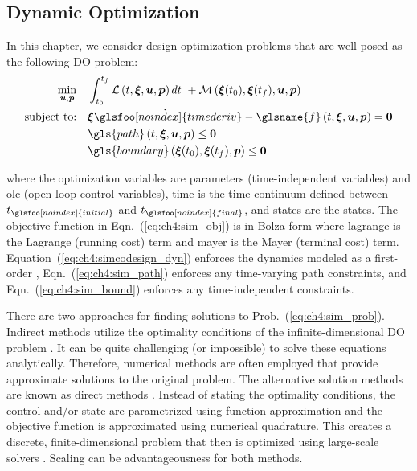 \subsection{Dynamic Optimization \label{sec:ch4:do}}

In this chapter, we consider design optimization problems that are well-posed as the following DO problem:
\begin{subequations}
\label{eq:ch4:sim_prob}
\begin{align}
\min_{\bu, \bp} \quad & \int_{t_0}^{t_f} \lagrange \left( t, \bxi, \bu, \bp \right) dt \ + \mayer \left( \bxi(t_0), \bxi(t_f), \bu, \bp \right) \label{eq:ch4:sim_obj} \\
\text{subject to:} \quad & \dot{\bxi \glsfoo[noindex]{timederiv}} - \glsname{f} \left( t, \bxi, \bu, \bp \right) = \bzero \label{eq:ch4:simcodesign_dyn} \\
& \gls{path} \left( t, \bxi, \bu, \bp \right) \leq \bzero \label{eq:ch4:sim_path} \\
& \gls{boundary} \left( \bxi(t_0), \bxi(t_f), \bp \right) \leq \bzero \label{eq:ch4:sim_bound}
\end{align}
\end{subequations}

\noindent where the optimization variables are \gls{parameters} (time-independent variables) and \gls{olc} (open-loop control variables), \gls{time} is the time continuum defined between $t_{\glsfoo[noindex]{initial}}$ and $t_{\glsfoo[noindex]{final}}$, and \gls{states} are the states. 
The objective function in Eqn.~(\ref{eq:ch4:sim_obj}) is in Bolza form where \gls{lagrange} is the Lagrange (running cost) term and \gls{mayer} is the Mayer (terminal cost) term.
Equation~(\ref{eq:ch4:simcodesign_dyn}) enforces the dynamics modeled as a first-order , Eqn.~(\ref{eq:ch4:sim_path}) enforces any time-varying path constraints, and Eqn.~(\ref{eq:ch4:sim_bound}) enforces any time-independent constraints. 

There are two approaches for finding solutions to Prob.~(\ref{eq:ch4:sim_prob}).
Indirect methods utilize the optimality conditions of the infinite-dimensional DO problem \cite{Bryson1975a, Biegler2010a, Betts2010a}.
It can be quite challenging (or impossible) to solve these equations analytically. 
Therefore, numerical methods are often employed that provide approximate solutions to the original problem.
The alternative solution methods are known as direct methods \cite{Biegler2010a, Betts2010a}. Instead of stating the optimality conditions, the control and/or state are parametrized using function approximation and the objective function is approximated using numerical quadrature.
This creates a discrete, finite-dimensional problem that then is optimized using large-scale  solvers \cite{Biegler2010a, Betts2010a, Herber2014a, Rao2010a}.
Scaling can be advantageousness for both methods.

